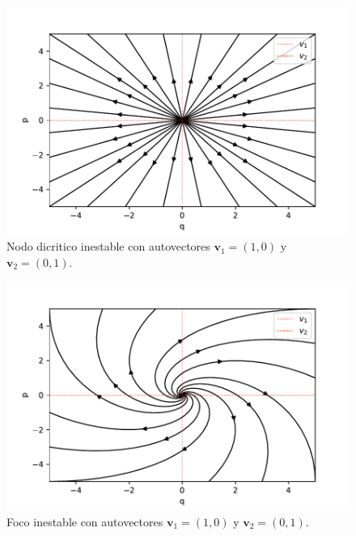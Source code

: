 \documentclass[12pt,a4paper]{article}
\numberwithin{equation}{section}
\numberwithin{figure}{section}
\newcommand{\vn}{\mathbf{v}}
\begin{document}
\begin{figure}[h!] \centering
\includegraphics[scale=0.9]{nodo-dicritico-inestable.pdf}
\caption{Nodo dicritico inestable con autovectores $\vn_1=(1,0)$ y $\vn_2 = (0,1)$.}
\label{Fig:05-nodo-dicritico-inestable}
\end{figure}

\newpage


\begin{figure}[h!] \centering
\includegraphics[scale=0.9]{nodo-inestable.pdf}
\caption{Foco inestable con autovectores $\vn_1=(1,0)$ y $\vn_2 = (0,1)$.}
\label{Fig:06-nodo-estable}
\end{figure}
\end{document}
